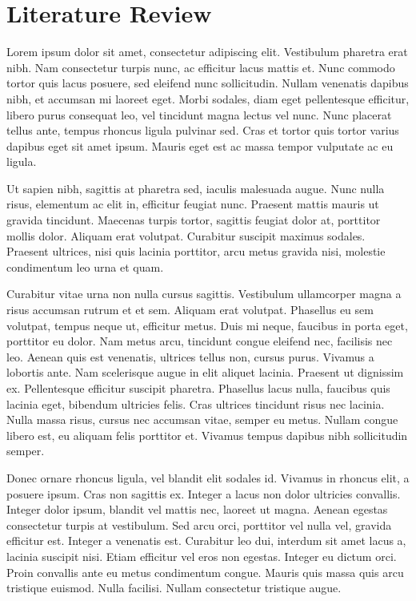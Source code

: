 \documentclass[a4paper]{memoir}
\begin{document}
\chapter*{Literature Review}
\label{literaturereview}

Lorem ipsum dolor sit amet, consectetur adipiscing elit. Vestibulum pharetra erat nibh. Nam consectetur turpis nunc, ac efficitur lacus mattis et. Nunc commodo tortor quis lacus posuere, sed eleifend nunc sollicitudin. Nullam venenatis dapibus nibh, et accumsan mi laoreet eget. Morbi sodales, diam eget pellentesque efficitur, libero purus consequat leo, vel tincidunt magna lectus vel nunc. Nunc placerat tellus ante, tempus rhoncus ligula pulvinar sed. Cras et tortor quis tortor varius dapibus eget sit amet ipsum. Mauris eget est ac massa tempor vulputate ac eu ligula. 

Ut sapien nibh, sagittis at pharetra sed, iaculis malesuada augue. Nunc nulla risus, elementum ac elit in, efficitur feugiat nunc. Praesent mattis mauris ut gravida tincidunt. Maecenas turpis tortor, sagittis feugiat dolor at, porttitor mollis dolor. Aliquam erat volutpat. Curabitur suscipit maximus sodales. Praesent ultrices, nisi quis lacinia porttitor, arcu metus gravida nisi, molestie condimentum leo urna et quam. 

Curabitur vitae urna non nulla cursus sagittis. Vestibulum ullamcorper magna a risus accumsan rutrum et et sem. Aliquam erat volutpat. Phasellus eu sem volutpat, tempus neque ut, efficitur metus. Duis mi neque, faucibus in porta eget, porttitor eu dolor. Nam metus arcu, tincidunt congue eleifend nec, facilisis nec leo. Aenean quis est venenatis, ultrices tellus non, cursus purus. Vivamus a lobortis ante. Nam scelerisque augue in elit aliquet lacinia. Praesent ut dignissim ex. Pellentesque efficitur suscipit pharetra. Phasellus lacus nulla, faucibus quis lacinia eget, bibendum ultricies felis. Cras ultrices tincidunt risus nec lacinia. Nulla massa risus, cursus nec accumsan vitae, semper eu metus. Nullam congue libero est, eu aliquam felis porttitor et. Vivamus tempus dapibus nibh sollicitudin semper. 

Donec ornare rhoncus ligula, vel blandit elit sodales id. Vivamus in rhoncus elit, a posuere ipsum. Cras non sagittis ex. Integer a lacus non dolor ultricies convallis. Integer dolor ipsum, blandit vel mattis nec, laoreet ut magna. Aenean egestas consectetur turpis at vestibulum. Sed arcu orci, porttitor vel nulla vel, gravida efficitur est. Integer a venenatis est. Curabitur leo dui, interdum sit amet lacus a, lacinia suscipit nisi. Etiam efficitur vel eros non egestas. Integer eu dictum orci. Proin convallis ante eu metus condimentum congue. Mauris quis massa quis arcu tristique euismod. Nulla facilisi. Nullam consectetur tristique augue. 
\end{document}
